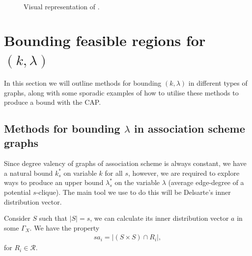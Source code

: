 \documentclass[11pt, baustms]{amsproc}
\theoremstyle{scplain}
\begin{document}
\begin{figure}[!ht]
\begin{minipage}{0.48\textwidth}

\end{minipage}%

\caption{Visual representation of .}
\label{feasible region}
\end{figure}

\section{Bounding feasible regions for $(k,\lambda)$}
In this section we will outline methods for bounding $(k,\lambda)$ in different types of graphs, along with some sporadic examples of how to utilise these methods to produce a bound with the CAP.

\subsection{Methods for bounding $\lambda$ in association scheme graphs} 

Since degree valency of graphs of association scheme is always constant, we have a natural bound $k_s^*$ on variable $k$ for all $s$, however, we are required to explore ways to produce an upper bound $\lambda^*_s$ on the variable $\lambda$ (average edge-degree of a potential $s$-clique). The main tool we use to do this will be Delsarte's inner distribution vector. 

    Consider $S$ such that $|S|=s$, we can calculate its inner distribution vector $a$ in some $\Gamma_X$. We have the property \begin{align} s a_i = |(S \times S) \cap R_i|, \label{innerdid} \end{align} for $R_i \in \mathcal{R}$.
\end{document}
